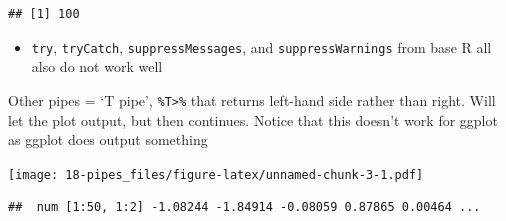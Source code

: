 \documentclass[]{book}
\newenvironment{Shaded}{\begin{snugshade}}{\end{snugshade}}
\newcommand{\DataTypeTok}[1]{\textcolor[rgb]{0.13,0.29,0.53}{#1}}
\newcommand{\DecValTok}[1]{\textcolor[rgb]{0.00,0.00,0.81}{#1}}
\newcommand{\KeywordTok}[1]{\textcolor[rgb]{0.13,0.29,0.53}{\textbf{#1}}}
\newcommand{\NormalTok}[1]{#1}
\newcommand{\OperatorTok}[1]{\textcolor[rgb]{0.81,0.36,0.00}{\textbf{#1}}}
\newcommand{\StringTok}[1]{\textcolor[rgb]{0.31,0.60,0.02}{#1}}
\providecommand{\tightlist}{%
  \setlength{\itemsep}{0pt}\setlength{\parskip}{0pt}}
\theoremstyle{definition}
\theoremstyle{definition}
\theoremstyle{definition}
\theoremstyle{remark}
\begin{document}
\begin{Shaded}
\end{Shaded}

\begin{verbatim}
## [1] 100
\end{verbatim}

\begin{itemize}
\tightlist
\item
  \texttt{try}, \texttt{tryCatch}, \texttt{suppressMessages}, and
  \texttt{suppressWarnings} from base R all also do not work well
\end{itemize}

Other pipes = `T pipe', \texttt{\%T\textgreater{}\%} that returns
left-hand side rather than right. Will let the plot output, but then
continues. Notice that this doesn't work for ggplot as ggplot does
output something

\begin{Shaded}
\end{Shaded}

\texttt{[image: 18-pipes\_files/figure-latex/unnamed-chunk-3-1.pdf]}

\begin{verbatim}
##  num [1:50, 1:2] -1.08244 -1.84914 -0.08059 0.87865 0.00464 ...
\end{verbatim}

\begin{Shaded}
\end{Shaded}
\end{document}
